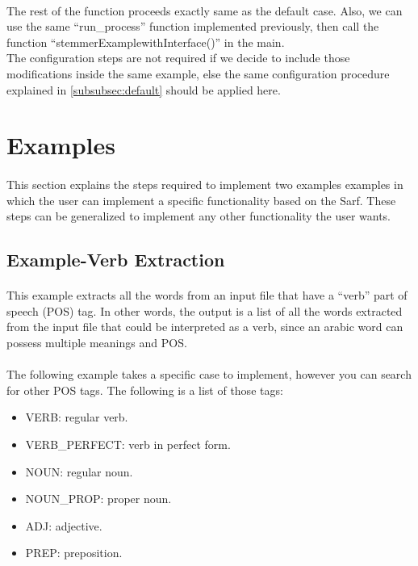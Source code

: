 \documentclass{article}
\begin{document}
\paragraph{}
The rest of the function proceeds exactly same as the default case. Also, we can use the same ``run\_process'' function implemented previously, then call the function ``stemmerExamplewithInterface()'' in the main.\\
The configuration steps are not required if we decide to include those modifications inside the same example, else the same configuration procedure explained in \ref{subsubsec:default} should be applied here.

\section{Examples}
\label{sec:examples}
\paragraph{}
This section explains the steps required to implement two examples examples in which the user can implement a specific functionality based on the Sarf. These steps can be generalized to implement any other functionality the user wants.

\subsection{Example-Verb Extraction}
\paragraph{}
This example extracts all the words from an input file that have a ``verb'' part of speech (POS) tag. In other words, the output is a list of all the words extracted from the input file that could be interpreted as a verb, since an arabic word can possess multiple meanings and POS.

\paragraph{}
The following example takes a specific case to implement, however you can search for other POS tags. The following is a list of those tags:
\begin{itemize}
\item VERB: regular verb.
\item VERB\_PERFECT: verb in perfect form.
\item NOUN: regular noun.
\item NOUN\_PROP: proper noun.
\item ADJ: adjective.
\item PREP: preposition.
\end{itemize}
\end{document}

